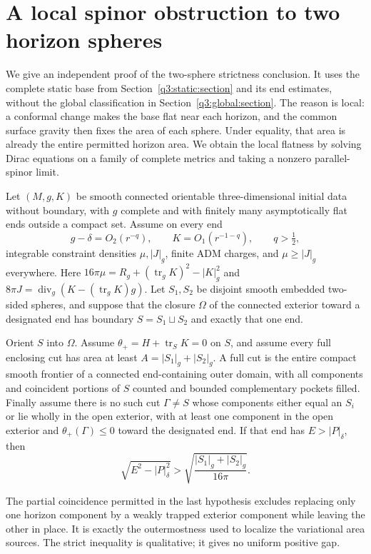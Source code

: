 \section{A local spinor obstruction to two horizon spheres}
\label{q3:local-spinor:section}

We give an independent proof of the two-sphere strictness conclusion.
It uses the complete static base from Section~\ref{q3:static:section}
and its end estimates, without the global classification in
Section~\ref{q3:global:section}. The reason is local: a conformal change makes
the base flat near each horizon, and the common surface gravity then
fixes the area of each sphere. Under equality, that area is already the
entire permitted horizon area. We obtain the local flatness by solving
Dirac equations on a family of complete metrics and taking a nonzero
parallel-spinor limit.

\begin{theorem}
\label{q3:local-spinor:strictness}
Let $(M,g,K)$ be smooth connected orientable three-dimensional initial
data without boundary, with $g$ complete and with finitely many
asymptotically flat ends outside a compact set. Assume on every end
\[
 g-\delta=O_2(r^{-q}),\qquad K=O_1(r^{-1-q}),\qquad q>\tfrac12,
\]
integrable constraint densities $\mu,|J|_g$, finite ADM charges, and
$\mu\geq |J|_g$ everywhere. Here
$16\pi\mu=R_g+(\operatorname{tr}_gK)^2-|K|_g^2$ and
$8\pi J=\operatorname{div}_g(K-(\operatorname{tr}_gK)g)$.
Let $S_1,S_2$ be disjoint smooth embedded two-sided spheres, and suppose
that the closure $\Omega$ of the connected exterior toward a designated
end has boundary $S=S_1\sqcup S_2$ and exactly that one end.

Orient $S$ into $\Omega$. Assume $\theta_+=H+\operatorname{tr}_S K=0$
on $S$, and assume every full enclosing cut has area at least
$A=|S_1|_g+|S_2|_g$. A full cut is the entire compact smooth frontier
of a connected end-containing outer domain, with all components and
coincident portions of $S$ counted and bounded complementary pockets
filled. Finally assume there is no such cut $\Gamma\ne S$ whose
components either equal an $S_i$ or lie wholly in the open exterior,
with at least one component in the open exterior and
$\theta_+(\Gamma)\leq0$ toward the designated end.
If that end has $E>|P|_\delta$, then
\[
 \sqrt{E^2-|P|_\delta^2}
    >\sqrt{\frac{|S_1|_g+|S_2|_g}{16\pi}}.
\]
\end{theorem}

The partial coincidence permitted in the last hypothesis excludes
replacing only one horizon component by a weakly trapped exterior
component while leaving the other in place. It is exactly the
outermostness used to localize the variational area sources.
The strict inequality is qualitative; it gives no uniform positive gap.

